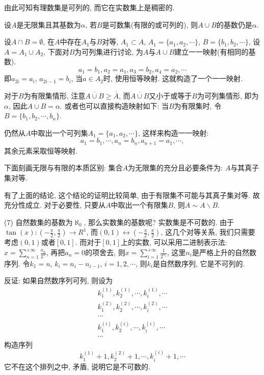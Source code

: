 \documentclass[12pt,a4paper,openany]{book}
\begin{document}
由此可知有理数集是可列的, 而它在实数集上是稠密的.

设$A$是无限集且其基数为$\alpha$, 若$B$是可数集(有限的或可列的), 则$A \cup B$的基数仍是$\alpha$. 

设$A \cap B = \emptyset$, 在$A$中存在$A_1$与$B$对等, $A_1 \subset A$, $A_1 = \{a_1, a_2, \cdots \}$, $B = \{b_1, b_2, \cdots \}$, 设$A = A_1 \cup A_2$, 下面对$B$为可列集进行讨论, 为$A$与$A \cup B$建立一一映射(有相同的基数).
$$
a_1 = b_1, a_2 = a_1, a_3 = b_2, a_4 = a_2, \cdots
$$
即$a_{2i} = a_i$, $a_{2i-1} = b_i$, 当$a \in A_2$时, 使用恒等映射. 这就构造了一个一一映射.

对于$B$为有限集情形, 注意$\overline{A \cup B} \ge \overline{A}$, 而$\overline{A \cup B}$又小于或等于$B$为可列集情形, 即为$\alpha$, 因此$A \cup B = \alpha$. 或者也可以直接构造映射如下: 当$B$为有限集时, 令$B = \{b_1, b_2, \cdots, b_n\}$.

仍然从$A$中取出一个可列集$A_1 = \{a_1, a_2, \cdots \}$, 这样来构造一一映射:
$$
a_1 = b_1, \cdots, a_n = b_n, a_{n+1} = a_1, \cdots,
$$
其余元素采取恒等映射.

下面刻画无限与有限的本质区别: 集合$A$为无限集的充分且必要条件为: $A$与其真子集对等.

有了上面的结论, 这个结论的证明比较简单, 由于有限集不可能与其真子集对等. 故充分性成立. 对于必要性, 只要从$A$中取出一个有限集$B$, 则$A \sim A \backslash B$.

(7) 自然数集的基数为$\aleph_0$, 那么实数集的基数呢? 实数集是不可数的. 由于$\tan(x): (-\frac{\pi}{2}, \frac{\pi}{2}) \rightarrow R^1$, 而$(0, 1) \leftrightarrow (-\frac{\pi}{2}, \frac{\pi}{2})$, 这几个对等关系, 我们只需要考虑$(0, 1)$或者$[0, 1]$. 而对于$[0, 1]$上的实数, 可以采用二进制表示法: $x = \sum\limits_{n=1}^{+\infty}{\frac{a_n}{2^n}}$, 再把$a_n = 0$的项舍去, 则$x = \sum\limits_{i=1}^{+\infty}{\frac{1}{2^{n_i}}}$, 这里$n_i$是严格上升的自然数序列. 令$k_1 = n$, $k_i =  n_i - n_{i-1}$, $i=1, 2, \cdots$, 则$k_i$是自然数序列, 它是不可列的.

反证: 如果自然数序列可列, 则设为
$$
\begin{aligned}
k_{1}^{(1)}, k_2^{(1)}, \cdots, k_i^{(1)}, \cdots \\
k_{1}^{(2)}, k_2^{(2)}, \cdots, k_i^{(2)}, \cdots \\
\cdots \\
k_{1}^{(i)}, k_2^{(i)}, \cdots, k_i^{(i)}, \cdots \\
\cdots
\end{aligned}
$$
构造序列
$$
k_1^{(1)} + 1, k_2^{(2)} + 1, \cdots, k_i^{(i)} + 1, \cdots
$$
它不在这个排列之中, 矛盾, 说明它是不可数的.
\end{document}
